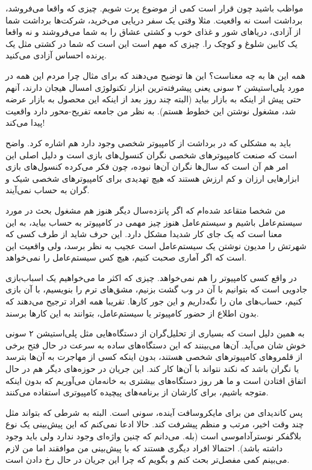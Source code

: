 مواظب باشید چون قرار است کمی از موضوع پرت شویم. چیزی که واقعا می‌فروشد،
برداشت است نه واقعیت. مثلا وقتی یک سفر دریایی می‌خرید، شرکت‌ها برداشت
شما از آزادی، دریاهای شور و غذای خوب و کشتی عشاق را به شما می‌فروشند و
نه واقعا یک کابین شلوغ و کوچک را. چیزی که مهم است این است که شما در
کشتی مثل یک پرنده احساس آزادی می‌کنید.

همه این ها به چه معناست؟ این ها توضیح می‌دهند که برای مثال چرا مردم این
همه در مورد پلی‌استیشن ۲ سونی یعنی پیشرفته‌ترین ابزار تکنولوژی امسال
هیجان دارند، آنهم حتی پیش از اینکه به بازار بیاید (البته چند روز بعد
از اینکه این محصول به بازار عرضه شد، مشغول نوشتن این خطوط هستم). به
نظر من جامعه تفریح-محور دارد واقعیت پیدا می‌کند!

باید به مشکلی که در برداشت از کامپیوتر شخصی وجود دارد هم اشاره
کرد. واضح است که صنعت کامپیوترهای شخصی نگران کنسول‌های بازی است و دلیل
اصلی این امر هم آن است که سال‌ها نگران آن‌ها نبوده، چون فکر می‌کرده
کنسول‌های بازی ابزارهایی ارزان و کم ارزش هستند که هیچ تهدیدی برای
کامپیوترهای شخصی شیک و گران به حساب نمی‌آیند.

من شخصا متقاعد شده‌ام که اگر پانزده‌سال دیگر هنوز هم مشغول بحث در مورد
سیستم‌عامل باشیم و سیستم‌عامل هنوز چیز مهمی در کامپیوتر به حساب بیاید،
به این معنا است که یک جای کار شدیدا مشکل دارد. این حرف شاید از طرف کسی
که شهرتش را مدیون نوشتن یک سیستم‌عامل است عجیب به نظر برسد، ولی واقعیت
این است که اگر آماری صحبت کنیم، هیچ کس سیستم‌عامل را نمی‌خواهد.

در واقع کسی کامپیوتر را هم نمی‌خواهد. چیزی که اکثر ما می‌خواهیم یک
اسباب‌بازی جادویی است که بتوانیم با آن در وب گشت بزنیم، مشق‌های ترم را
بنویسیم، با آن بازی کنیم، حساب‌های مان را نگه‌داریم و این جور
کارها. تقریبا همه افراد ترجیح می‌دهند که بدون اطلاع از حضور کامپیوتر یا
سیستم‌عامل، بتوانند به این کارها برسند.

به همین دلیل است که بسیاری از تحلیل‌گران از دستگاه‌هایی مثل پلی‌استیشن ۲
سونی خوش شان می‌آید. آن‌ها می‌بینند که این دستگاه‌های ساده به سرعت در حال
فتح برخی از قلمروهای کامپیوترهای شخصی هستند، بدون اینکه کسی از مهاجرت
به آن‌ها بترسد یا نگران باشد که نکند نتواند با آن‌ها کار کند. این جریان
در حوزه‌های دیگر هم در حال اتفاق افتادن است و ما هر روز دستگاه‌های
بیشتری به خانه‌مان می‌آوریم که بدون اینکه متوجه باشیم، برای کارشان از
برنامه‌های پیچیده کامپیوتری استفاده می‌کنند.

پس کاندیدای من برای مایکروسافت آینده،‌ سونی است. البته به شرطی که
بتواند مثل چند وقت اخیر، مرتب و منظم پیشرفت کند. حالا ادعا نمی‌کنم که
این پیش‌بینی یک نوع بلاگفکر نوسترآداموسی است (بله. می‌دانم که چنین
واژه‌ای وجود ندارد ولی باید وجود داشته باشد). احتمالا افراد دیگری هستند
که با پیش‌بینی من موافقند اما من لازم می‌بینم کمی مفصل‌تر بحث کنم و بگویم
که چرا این جریان در حال رخ دادن است.

